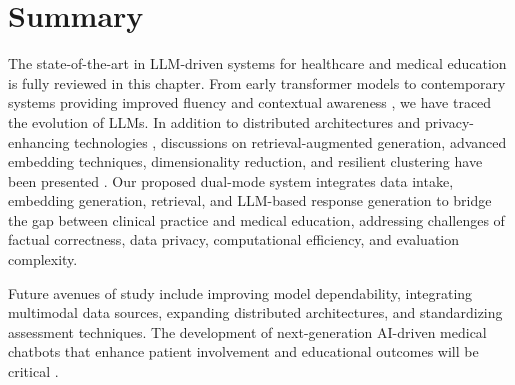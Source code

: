 \section{Summary}
The state-of-the-art in LLM-driven systems for healthcare and medical education is fully reviewed in this chapter. From early transformer models to contemporary systems providing improved fluency and contextual awareness \cite{gpt4tech, llama2023}, we have traced the evolution of LLMs. In addition to distributed architectures and privacy-enhancing technologies \cite{zichichi2022, eu2016}, discussions on retrieval-augmented generation, advanced embedding techniques, dimensionality reduction, and resilient clustering have been presented \cite{montagna2023, koopman2020}. Our proposed dual-mode system integrates data intake, embedding generation, retrieval, and LLM-based response generation to bridge the gap between clinical practice and medical education, addressing challenges of factual correctness, data privacy, computational efficiency, and evaluation complexity.

Future avenues of study include improving model dependability, integrating multimodal data sources, expanding distributed architectures, and standardizing assessment techniques. The development of next-generation AI-driven medical chatbots that enhance patient involvement and educational outcomes will be critical \cite{tabak2014, park2024}.

\clearpage
